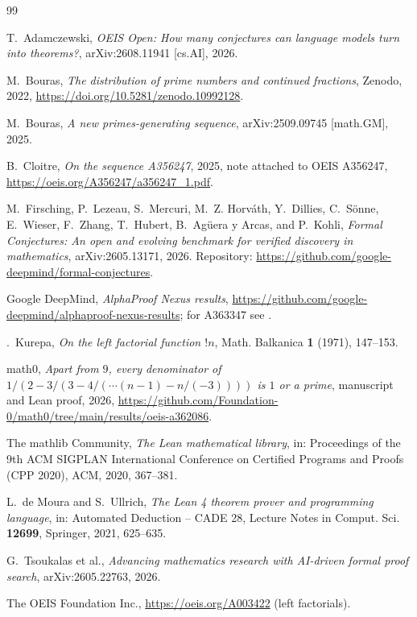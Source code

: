 \documentclass[11pt]{amsart}
\theoremstyle{plain}
\theoremstyle{definition}
\begin{document}
\begin{thebibliography}{99}

T.~Adamczewski, \emph{OEIS Open: How many conjectures can language models turn into theorems?}, arXiv:2608.11941 [cs.AI], 2026.

M.~Bouras, \emph{The distribution of prime numbers and continued fractions}, Zenodo, 2022, \url{https://doi.org/10.5281/zenodo.10992128}.

M.~Bouras, \emph{A new primes-generating sequence}, arXiv:2509.09745 [math.GM], 2025.

B.~Cloitre, \emph{On the sequence A356247}, 2025, note attached to OEIS A356247, \url{https://oeis.org/A356247/a356247_1.pdf}.

M.~Firsching, P.~Lezeau, S.~Mercuri, M.~Z. Horv\'ath, Y.~Dillies, C.~S\"onne, E.~Wieser, F.~Zhang, T.~Hubert, B.~Ag\"uera y Arcas, and P.~Kohli, \emph{Formal Conjectures: An open and evolving benchmark for verified discovery in mathematics}, arXiv:2605.13171, 2026. Repository: \url{https://github.com/google-deepmind/formal-conjectures}.

Google DeepMind, \emph{AlphaProof Nexus results}, \url{https://github.com/google-deepmind/alphaproof-nexus-results}; for A363347 see .

\DJ.~Kurepa, \emph{On the left factorial function $!n$}, Math. Balkanica \textbf{1} (1971), 147--153.

math0, \emph{Apart from $9$, every denominator of $1/(2-3/(3-4/(\cdots(n-1)-n/(-3))))$ is $1$ or a prime}, manuscript and Lean proof, 2026, \url{https://github.com/Foundation-0/math0/tree/main/results/oeis-a362086}.

The mathlib Community, \emph{The Lean mathematical library}, in: Proceedings of the 9th ACM SIGPLAN International Conference on Certified Programs and Proofs (CPP 2020), ACM, 2020, 367--381.

L.~de Moura and S.~Ullrich, \emph{The Lean 4 theorem prover and programming language}, in: Automated Deduction -- CADE 28, Lecture Notes in Comput. Sci. \textbf{12699}, Springer, 2021, 625--635.

G.~Tsoukalas et al., \emph{Advancing mathematics research with AI-driven formal proof search}, arXiv:2605.22763, 2026.

The OEIS Foundation Inc., \url{https://oeis.org/A003422} (left factorials).


\end{thebibliography}
\end{document}
